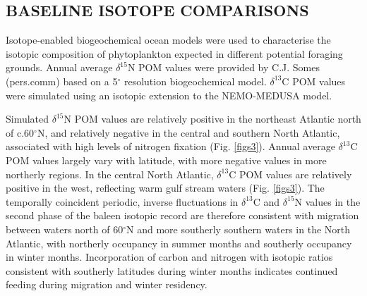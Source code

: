 \documentclass[a4paper,12pt]{article}
\begin{document}
\subsection*{BASELINE ISOTOPE COMPARISONS}
Isotope-enabled biogeochemical ocean models\cite{magozzi2017using,schmittner2016complementary} were used to characterise the isotopic composition of phytoplankton expected in different potential foraging grounds. 
Annual average $\delta^{15}$N POM values were provided by C.J. Somes (pers.comm) based on a 5$^{\circ}$ resolution biogeochemical model. 
$\delta^{13}$C POM values were simulated using an isotopic extension to the NEMO-MEDUSA model\cite{magozzi2017using}.
 
Simulated $\delta^{15}$N POM values are relatively positive in the northeast Atlantic north of c.60$^{\circ}$N, and relatively negative in the central and southern North Atlantic, associated with high levels of nitrogen fixation (Fig. \ref{figs3}). 
Annual average $\delta^{13}$C POM values largely vary with latitude, with more negative values in more northerly regions. 
In the central North Atlantic, $\delta^{13}$C POM values are relatively positive in the west, reflecting warm gulf stream waters (Fig. \ref{figs3}). 
The temporally coincident periodic, inverse fluctuations in $\delta^{13}$C and $\delta^{15}$N values in the second phase of the baleen isotopic record are therefore consistent with migration between waters north of 60$^{\circ}$N and more southerly southern waters in the North Atlantic, with northerly occupancy in summer months and southerly occupancy in winter months. 
Incorporation of carbon and nitrogen with isotopic ratios consistent with southerly latitudes during winter months indicates continued feeding during migration and winter residency.
 
\end{document}
